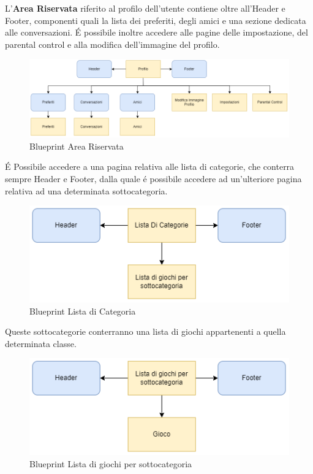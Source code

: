 \documentclass[../Report.tex]{subfiles}
\begin{document}
    L'\textbf{Area Riservata} riferito al profilo dell'utente contiene oltre all'Header e Footer, componenti quali la lista dei preferiti, degli amici e una sezione dedicata alle conversazioni. 
    É possibile inoltre accedere alle pagine delle impostazione, del parental control e alla modifica dell'immagine del profilo. 
    \begin{figure}[H]
        \includegraphics[width=\linewidth]{BP_profilo.png}
        \centering
        \caption{Blueprint Area Riservata}
    \end{figure}


    É Possibile accedere a una pagina relativa alle lista di categorie, che conterra sempre Header e Footer, dalla quale é possibile accedere ad un'ulteriore pagina relativa ad una determinata sottocategoria.
    \begin{figure}[H]
        \includegraphics[width=.7\linewidth]{BP_listaCategoria.png}
        \centering
        \caption{Blueprint Lista di Categoria}
    \end{figure}
    Queste sottocategorie conterranno una lista di giochi appartenenti a quella determinata classe.
    \begin{figure}[H]
        \includegraphics[width=.7\linewidth]{BP_ListaGiochiPerSottocategoria.png}
        \centering
        \caption{Blueprint Lista di giochi per sottocategoria}
    \end{figure}
\end{document}
